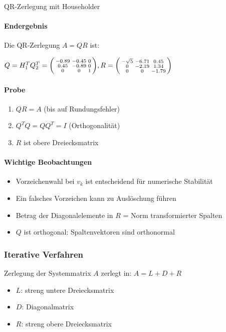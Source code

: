 \begin{example2}[breakable]{QR-Zerlegung mit Householder}
\paragraph{Endergebnis}
Die QR-Zerlegung $A = QR$ ist:

$Q = H_1^TQ_2^T = \begin{psmallmatrix}
-0.89 & -0.45 & 0\\
0.45 & -0.89 & 0\\
0 & 0 & 1
\end{psmallmatrix},
R = \begin{psmallmatrix}
-\sqrt{5} & -6.71 & 0.45\\
0 & -2.19 & 1.34\\
0 & 0 & -1.79
\end{psmallmatrix}$

\paragraph{Probe}
\small
\begin{enumerate}
    \item $QR = A$ (bis auf Rundungsfehler)
    \item $Q^TQ = QQ^T = I$ (Orthogonalität)
    \item $R$ ist obere Dreiecksmatrix
\end{enumerate}

\paragraph{Wichtige Beobachtungen}
\small
\begin{itemize}
    \item Vorzeichenwahl bei $v_k$ ist entscheidend für numerische Stabilität
    \item Ein falsches Vorzeichen kann zu Auslöschung führen
    \item Betrag der Diagonalelemente in $R$ = Norm transformierter Spalten
    \item $Q$ ist orthogonal: Spaltenvektoren sind orthonormal
\end{itemize}
\end{example2}




\subsubsection{Iterative Verfahren}

\begin{definition}{Zerlegung der Systemmatrix} $A$ zerlegt in: $A = L + D + R$
    \small
\begin{itemize}
    \item $L$: streng untere Dreiecksmatrix
    \item $D$: Diagonalmatrix
    \item $R$: streng obere Dreiecksmatrix
\end{itemize}
\end{definition}


